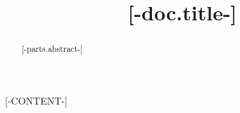 \documentclass{article}
\title{[-doc.title-]}
\begin{document}
\maketitle
\begin{abstract}
[-parts.abstract-]
\end{abstract}
[-CONTENT-]


\end{document}
